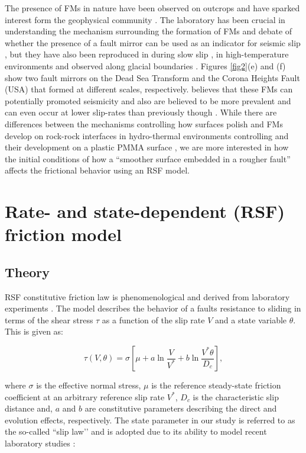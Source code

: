 \documentclass[preprint,1p, 10pt,authoryear]{elsarticle}
\begin{document}
The presence of FMs in nature have been observed on outcrops and have sparked interest form the geophysical community \citep{Fondriest2013, Kirkpartick2013, Siman-Tov2013}.  The laboratory has been crucial in understanding the mechanism surrounding the formation of FMs and debate of whether the presence of a fault mirror can be used as an indicator for seismic slip \citep{Fondriest2013,Siman-Tov2013,Pozzi2018}, but they have also been reproduced in during slow slip \citep{Tisato2012,Siman-Tov2015}, in high-temperature environments \citep{Pluymakers2017} and observed along glacial boundaries \citep{Siman-Tov2017}. Figures \ref{fig2}(e) and (f) show two fault mirrors on the Dead Sea Transform and the Corona Heights Fault (USA) that formed at different scales, respectively.  \citet{Goldberg2016} believes that these FMs can potentially promoted seismicity and also are believed to be more prevalent and can even occur at lower slip-rates than previously though \citep{Verbena2019}.  While there are differences between the mechanisms controlling how surfaces polish and FMs develop on rock-rock interfaces in hydro-thermal environments controlling and their development on a plastic PMMA surface \citep{Bouissou1998}, we are  more interested in how the initial conditions of how a ``smoother surface embedded in a rougher fault'' affects the frictional behavior using an RSF model. 

\section{Rate- and state-dependent (RSF) friction model}
\subsection{Theory}
\label{Theory}
RSF constitutive friction law is phenomenological and derived from laboratory experiments \citep{Dieterich1979, Ruina1983}.  The model describes the behavior of a faults resistance to sliding in terms of the shear stress $\tau$ as a function of the slip rate $V$ and a state variable $\theta$. This is given as:

\begin{equation}
\label{eq5}
\tau \left( V,\theta \right) = \sigma \left[\mu + a \ln\frac{V}{V^{*}} + b \ln\frac{V^{*}\theta}{D_{c}}\right],
\end{equation}   

\noindent where $\sigma$ is the effective normal stress, $\mu$ is the reference steady-state friction coefficient at an arbitrary reference slip rate $V^{*}$, $D_{c}$ is the characteristic slip distance and, $a$ and $b$ are constitutive parameters describing the direct and evolution effects, respectively.  The state parameter in our study is referred to as the so-called ``slip law’’ and is adopted due to its ability to model recent laboratory studies \citep{Bhattacharya2015, Kaneko2011, Kaneko2016}:
\end{document}
